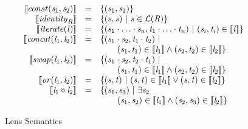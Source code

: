 \begin{figure}
\[
\begin{array}{rcl}
\SemanticsOf{const(\String_1,\String_2)} &=& \SetOf{(\String_1,\String_2)}\\

\SemanticsOf{\IdentityLensOf{\Regex}} &=& \SetOf{(\String,\String)\SuchThat\String\in\LanguageOf{\Regex}}\\

\SemanticsOf{\IterateLens{\Lens}} &=& \SetOf{(\String_1\Concat\ldots\Concat\String_n,
\StringAlt_1\Concat\ldots\Concat\StringAlt_n)\SuchThat
(\String_i,\StringAlt_i)\in\SemanticsOf{\Lens}}\\

\SemanticsOf{\ConcatLens{\Lens_1}{\Lens_2}} &=&
\SetOf{(\String_1\Concat\String_2,\StringAlt_1\Concat\StringAlt_2)\SuchThat\\
& & \hspace*{2em}(\String_1,\StringAlt_1)\in\SemanticsOf{\Lens_1}\BooleanAnd
(\String_2,\StringAlt_2)\in\SemanticsOf{\Lens_2}}\\

\SemanticsOf{\SwapLens{\Lens_1}{\Lens_2}} &=&
\SetOf{(\String_1\Concat\String_2,\StringAlt_2\Concat\StringAlt_1)\SuchThat\\
& & \hspace*{2em}(\String_1,\StringAlt_1)\in\SemanticsOf{\Lens_1}\BooleanAnd
(\String_2,\StringAlt_2)\in\SemanticsOf{\Lens_2}}\\

\SemanticsOf{\OrLens{\Lens_1}{\Lens_2}} &=&
\SetOf{(\String,\StringAlt)
\SuchThat(\String,\StringAlt)\in\SemanticsOf{\Lens_1}
\BooleanOr(\String,\StringAlt)\in\SemanticsOf{\Lens_2}}\\

\SemanticsOf{\ComposeLens{\Lens_1}{\Lens_2}} &=&
\SetOf{(\String_1,\String_3)\SuchThat\exists\String_2\\
& & \hspace*{2em}(\String_1,\String_2)\in\SemanticsOf{\Lens_1}\BooleanAnd
(\String_2,\String_3)\in\SemanticsOf{\Lens_2}}
\end{array}
\]
\caption{Lens Semantics}
\label{fig:lens-semantics}
\end{figure}

